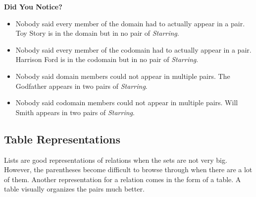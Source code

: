 \documentclass{ximera}
\begin{document}
\begin{warning} \textbf{\textcolor{red!80!black}{Did You Notice?}}  \\
\begin{itemize}
\item Nobody said every member of the domain had to actually appear in a pair.  Toy Story is in the domain but in no pair of \textit{Starring}.
\item Nobody said every member of the codomain had to actually appear in a pair.  Harrison Ford is in the codomain but in no pair of \textit{Starring}.
\item Nobody said domain members could not appear in multiple pairs.  The Godfather appears in two pairs of \textit{Starring}.
\item Nobody said codomain members could not appear in multiple pairs.  Will Smith appears in two pairs of \textit{Starring}.
\end{itemize}
\end{warning}
















\subsection{Table Representations}



Lists are good representations of relations when the sets are not very big. However, the parentheses become difficult to browse through when there are a lot of them. Another representation for a relation comes in the form of a table. A table visually organizes the pairs much better.
\end{document}
